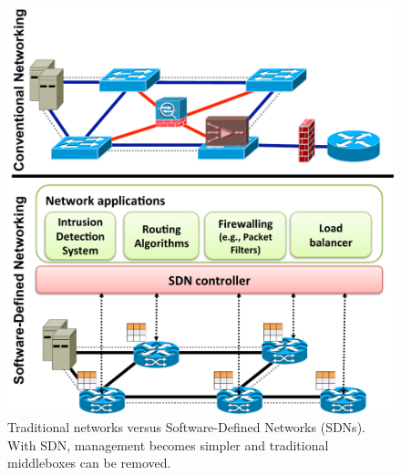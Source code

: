 \begin{figure}[t!]
\centering
\includegraphics[width=0.95\columnwidth]{figures/fig4_traditional_and_sdn.pdf}
\caption{Traditional networks versus Software-Defined Networks (SDNs). With SDN, management becomes simpler and traditional middleboxes can be removed.}
\label{fig:traditionalversusSDN}
\end{figure}

